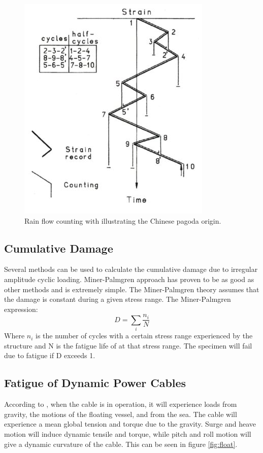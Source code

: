 \begin{figure}[H]
\centering
\includegraphics[scale=0.9]{figures/pagoda}
\caption[$\; \:$Rain flow counting]{Rain flow counting with illustrating the Chinese pagoda origin.    \cite{fatigue2016} }
 \label{fig:pagoda}
\end{figure}

\subsection{Cumulative Damage}
Several methods can be used to calculate the cumulative damage due to irregular amplitude cyclic loading. Miner-Palmgren approach has proven to be as good as other methods and is extremely simple. The Miner-Palmgren theory assumes that the damage is constant during a given stress range. The Miner-Palmgren expression:
\begin{equation}
    D=\sum_i \frac{n_i}{N} 
    \label{eq:MP}
\end{equation}
Where $n_i$ is the number of cycles with a certain stress range experienced by the structure and N is the fatigue life of at that stress range.\newline
\newline
The specimen will fail due to fatigue if D exceeds 1.

\subsection{Fatigue of Dynamic Power Cables}
\noindent According to \cite{Nasution2013}, when the cable is in operation, it will experience loads from gravity, the motions of the floating vessel, and from the sea. The cable will experience a mean global tension and torque due to the gravity. Surge and heave motion will induce dynamic tensile and torque, while pitch and roll motion will give a dynamic curvature of the cable. This can be seen in figure \ref{fig:float}. 

